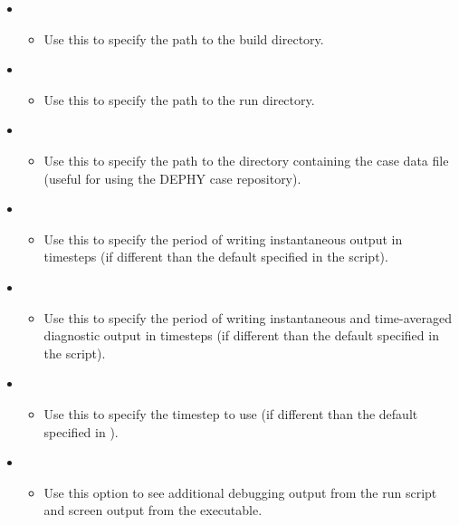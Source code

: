 \begin{itemize}
\begin{itemize}
	\end{itemize}
\item {}
	\begin{itemize}
	\item Use this to specify the path to the build directory.
	\end{itemize}
\item {}
	\begin{itemize}
	\item Use this to specify the path to the run directory.
	\end{itemize}
\item {}
	\begin{itemize}
	\item Use this to specify the path to the directory containing the case data file (useful for using the DEPHY case repository).
	\end{itemize}
\item {}
	\begin{itemize}
	\item Use this to specify the period of writing instantaneous output in timesteps (if different than the default specified in the script).
	\end{itemize}
\item {}
	\begin{itemize}
	\item Use this to specify the period of writing instantaneous and time-averaged diagnostic output in timesteps (if different than the default specified in the script).
	\end{itemize}
\item {}
	\begin{itemize}
	\item Use this to specify the timestep to use (if different than the default specified in ).
	\end{itemize}
\item {}
	\begin{itemize}
	\item Use this option to see additional debugging output from the run script and screen output from the executable.
	\end{itemize}
\end{itemize}


